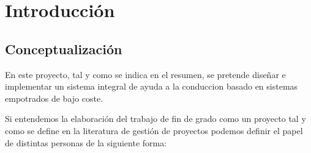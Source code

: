 \chapter{Introducción}


\section{Conceptualización}
En este proyecto, tal y como se indica en el resumen, se pretende diseñar e implementar un sistema integral de ayuda a la conduccion basado en sistemas empotrados de bajo coste.

Si entendemos la elaboración del trabajo de fin de grado como un proyecto tal y como se define en la literatura de gestión de proyectos \cite{project2005guia} \cite{guerin2015gestion} podemos definir el papel de distintas personas de la siguiente forma:

